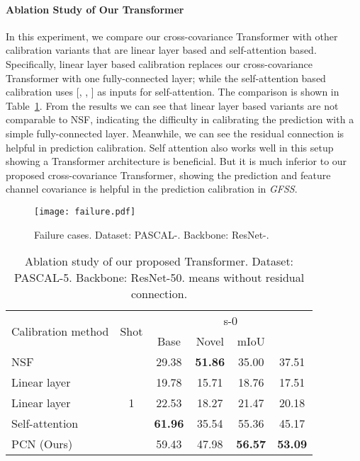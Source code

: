 \documentclass[journal]{IEEEtran}
\begin{document}
\paragraph{Ablation Study of Our Transformer }
In this experiment, we compare our cross-covariance Transformer with other calibration variants that are linear layer based and self-attention based.
Specifically, linear layer based calibration replaces our cross-covariance Transformer with one fully-connected layer; while the self-attention based calibration uses [, , ] as inputs for self-attention.
The comparison is shown in Table~\ref{tab:query_con}. 
From the results we can see that linear layer based variants are not comparable to NSF, indicating the difficulty in calibrating the prediction with a simple fully-connected layer. 
Meanwhile, we can see the residual connection is helpful in prediction calibration.
Self attention also works well in this setup showing a Transformer architecture is beneficial. But it is much inferior to our proposed cross-covariance Transformer, showing the prediction and feature channel covariance is helpful in the prediction calibration in \textit{GFSS}.

\begin{figure}[ht]
    \centering
    \texttt{[image: failure.pdf]}
    \caption{Failure cases. Dataset: PASCAL-. Backbone: ResNet-.}
    \label{fig:failure}
\end{figure}

\begin{table}[ht]
    \centering
    \caption{Ablation study of our proposed Transformer.  Dataset: PASCAL-5. Backbone: ResNet-50.  means without residual connection.}
\begin{tabular}{l|c|cccc}
    \hline
         \multirow{2}{*}{Calibration method} & \multirow{2}{*}{Shot} & \multicolumn{4}{c}{s-0} \\
         \cline{3-6}
          & & Base & Novel & mIoU &  \\
         \hline
          NSF & \multirow{5}{*}{1} & 29.38 & \textbf{51.86} & 35.00 & 37.51 \\
          Linear layer & & 19.78 & 15.71 & 18.76 & 17.51 \\
          Linear layer & & 22.53 & 18.27 & 21.47 & 20.18 \\
          Self-attention & & \textbf{61.96} & 35.54 & 55.36 & 45.17 \\
          PCN (Ours) & & 59.43 & 47.98 & \textbf{56.57} & \textbf{53.09} \\
    \hline
    \end{tabular}
\label{tab:query_con}
\end{table}
\end{document}
